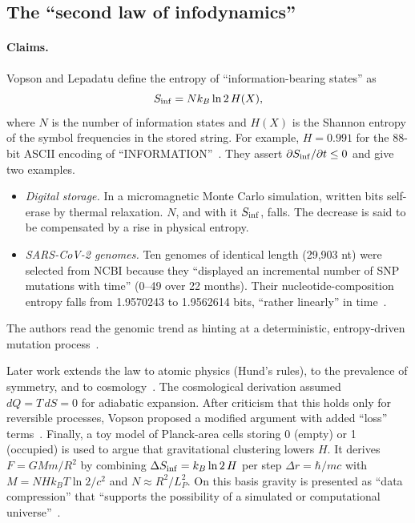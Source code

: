 \subsection{The ``second law of infodynamics''}
\label{sec:information:infodynamics}

\paragraph{Claims.}
Vopson and Lepadatu define the entropy of ``information-bearing states'' as
\begin{equation}
S_{\rm inf}=N k_B\ln2\,H(X),
\end{equation}
where $N$ is the number of information states and $H(X)$ is the Shannon entropy of the symbol
frequencies in the stored string. For example, $H=0.991$ for the 88-bit ASCII encoding of
``INFORMATION''~\cite{Vopson2022second}. They assert $\partial S_{\rm inf}/\partial t\le0$ and give
two examples.
\begin{itemize}
\item \emph{Digital storage.} In a micromagnetic Monte Carlo simulation, written bits self-erase by
  thermal relaxation. $N$, and with it $S_{\rm inf}$, falls. The decrease is said to be
  compensated by a rise in physical entropy.
\item \emph{SARS-CoV-2 genomes.} Ten genomes of identical length (29{,}903 nt) were selected from
  NCBI because they ``displayed an incremental number of SNP mutations with time'' (0--49 over 22
  months). Their nucleotide-composition entropy falls from 1.9570243 to 1.9562614 bits, ``rather
  linearly'' in time~\cite{Vopson2022second}.
\end{itemize}
The authors read the genomic trend as hinting at a deterministic, entropy-driven mutation
process~\cite{Vopson2022second,Vopson2022possible}.

Later work extends the law to atomic physics (Hund's rules), to the prevalence of symmetry, and to
cosmology~\cite{Vopson2023second,Vopson2025is}. The cosmological derivation assumed $dQ=T\,dS=0$
for adiabatic expansion. After criticism that this holds only for reversible processes, Vopson
proposed a modified argument with added ``loss'' terms~\cite{Vopson2025on}. Finally, a toy model of
Planck-area cells storing 0 (empty) or 1 (occupied) is used to argue that gravitational clustering
lowers $H$. It derives $F=GMm/R^2$ by combining $\Delta S_{\rm inf}=k_B\ln2\,H$ per step
$\Delta r=\hbar/mc$ with $M=NHk_BT\ln2/c^2$ and $N\approx R^2/L_P^2$. On this basis gravity is
presented as ``data compression'' that ``supports the possibility of a simulated or computational
universe''~\cite{Vopson2025is}.

